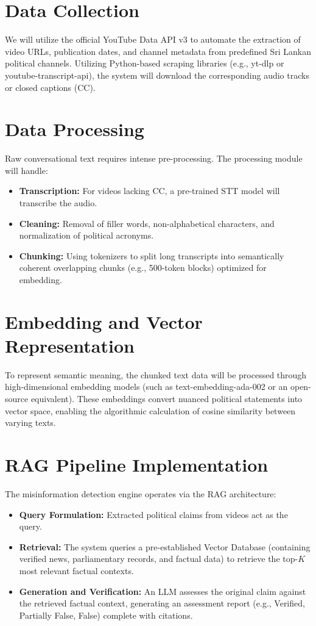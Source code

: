 \documentclass[12pt,a4paper]{report}
\begin{document}
\section{Data Collection}
We will utilize the official YouTube Data API v3 to automate the extraction of video URLs, publication dates, and channel metadata from predefined Sri Lankan political channels. Utilizing Python-based scraping libraries (e.g., yt-dlp or youtube-transcript-api), the system will download the corresponding audio tracks or closed captions (CC). 

\section{Data Processing}
Raw conversational text requires intense pre-processing. The processing module will handle:
\begin{itemize}
    \item \textbf{Transcription:} For videos lacking CC, a pre-trained STT model will transcribe the audio.
    \item \textbf{Cleaning:} Removal of filler words, non-alphabetical characters, and normalization of political acronyms.
    \item \textbf{Chunking:} Using tokenizers to split long transcripts into semantically coherent overlapping chunks (e.g., 500-token blocks) optimized for embedding.
\end{itemize}

\section{Embedding and Vector Representation}
To represent semantic meaning, the chunked text data will be processed through high-dimensional embedding models (such as text-embedding-ada-002 or an open-source equivalent). These embeddings convert nuanced political statements into vector space, enabling the algorithmic calculation of cosine similarity between varying texts.

\section{RAG Pipeline Implementation}
The misinformation detection engine operates via the RAG architecture:
\begin{itemize}
    \item \textbf{Query Formulation:} Extracted political claims from videos act as the query.
    \item \textbf{Retrieval:} The system queries a pre-established Vector Database (containing verified news, parliamentary records, and factual data) to retrieve the top-$K$ most relevant factual contexts.
    \item \textbf{Generation and Verification:} An LLM assesses the original claim against the retrieved factual context, generating an assessment report (e.g., Verified, Partially False, False) complete with citations.
\end{itemize}
\end{document}
